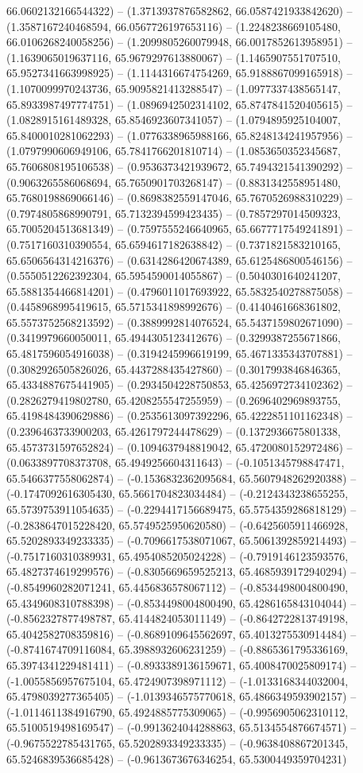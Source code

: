 66.0602132166544322) -- (1.3713937876582862, 66.0587421933842620) -- (1.3587167240468594, 66.0567726197653116) -- (1.2248238669105480, 66.0106268240058256) -- (1.2099805260079948, 66.0017852613958951) -- (1.1639065019637116, 65.9679297613880067) -- (1.1465907551707510, 65.9527341663998925) -- (1.1144316674754269, 65.9188867099165918) -- (1.1070099970243736, 65.9095821413288547) -- (1.0977337438565147, 65.8933987497774751) -- (1.0896942502314102, 65.8747841520405615) -- (1.0828915161489328, 65.8546923607341057) -- (1.0794895925104007, 65.8400010281062293) -- (1.0776338965988166, 65.8248134241957956) -- (1.0797990606949106, 65.7841766201810714) -- (1.0853650352345687, 65.7606808195106538) -- (0.9536373421939672, 65.7494321541390292) -- (0.9063265586068694, 65.7650901703268147) -- (0.8831342558951480, 65.7680198869066146) -- (0.8698382559147046, 65.7670526988310229) -- (0.7974805868990791, 65.7132394599423435) -- (0.7857297014509323, 65.7005204513681349) -- (0.7597555246640965, 65.6677717549241891) -- (0.7517160310390554, 65.6594617182638842) -- (0.7371821583210165, 65.6506564314216376) -- (0.6314286420674389, 65.6125486800546156) -- (0.5550512262392304, 65.5954590014055867) -- (0.5040301640241207, 65.5881354466814201) -- (0.4796011017693922, 65.5832540278875058) -- (0.4458968995419615, 65.5715341898992676) -- (0.4140461668361802, 65.5573752568213592) -- (0.3889992814076524, 65.5437159802671090) -- (0.3419979660050011, 65.4944305123412676) -- (0.3299387255671866, 65.4817596054916038) -- (0.3194245996619199, 65.4671335343707881) -- (0.3082926505826026, 65.4437288435427860) -- (0.3017993846846365, 65.4334887675441905) -- (0.2934504228750853, 65.4256972734102362) -- (0.2826279419802780, 65.4208255547255959) -- (0.2696402969893755, 65.4198484390629886) -- (0.2535613097392296, 65.4222851101162348) -- (0.2396463733900203, 65.4261797244478629) -- (0.1372936675801338, 65.4573731597652824) -- (0.1094637948819042, 65.4720080152972486) -- (0.0633897708373708, 65.4949256604311643) -- (-0.1051345798847471, 65.5466377558062874) -- (-0.1536832362095684, 65.5607948262920388) -- (-0.1747092616305430, 65.5661704823034484) -- (-0.2124343238655255, 65.5739753911054635) -- (-0.2294417156689475, 65.5754359286818129) -- (-0.2838647015228420, 65.5749525950620580) -- (-0.6425605911466928, 65.5202893349233335) -- (-0.7096617538071067, 65.5061392859214493) -- (-0.7517160310389931, 65.4954085205024228) -- (-0.7919146123593576, 65.4827374619299576) -- (-0.8305669659525213, 65.4685939172940294) -- (-0.8549960282071241, 65.4456836578067112) -- (-0.8534498004800490, 65.4349608310788398) -- (-0.8534498004800490, 65.4286165843104044) -- (-0.8562327877498787, 65.4144824053011149) -- (-0.8642722813749198, 65.4042582708359816) -- (-0.8689109645562697, 65.4013275530914484) -- (-0.8741674709116084, 65.3988932606231259) -- (-0.8865361795336169, 65.3974341229481411) -- (-0.8933389136159671, 65.4008470025809174) -- (-1.0055856957675104, 65.4724907398971112) -- (-1.0133168344032004, 65.4798039277365405) -- (-1.0139346575770618, 65.4866349593902157) -- (-1.0114611384916790, 65.4924885775309065) -- (-0.9956905062310112, 65.5100519498169547) -- (-0.9913624044288863, 65.5134554876674571) -- (-0.9675522785431765, 65.5202893349233335) -- (-0.9638408867201345, 65.5246839536685428) -- (-0.9613673676346254, 65.5300449359704231) 